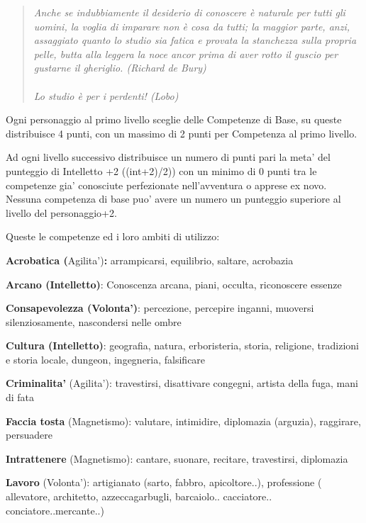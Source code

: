 \documentclass[a4paper,11pt,twoside,openany]{book}
\begin{document}
\begin{quote}\textit{
Anche se indubbiamente il desiderio di conoscere è naturale per tutti gli uomini, la voglia di imparare non è cosa da tutti; la maggior parte, anzi, assaggiato quanto lo studio sia fatica e provata la stanchezza sulla propria pelle, butta alla leggera la noce ancor prima di aver rotto il guscio per gustarne il gheriglio. (Richard de Bury)\\\\
Lo studio è per i perdenti! (Lobo)
}\end{quote}

Ogni personaggio al primo livello sceglie delle Competenze di Base, su queste distribuisce 4 punti, con un massimo di 2 punti per Competenza al primo livello.

Ad ogni livello successivo distribuisce un numero di punti pari la meta' del punteggio di Intelletto +2 ((int+2)/2)) con un minimo di 0 punti tra le competenze gia' conosciute perfezionate nell'avventura o apprese ex novo. Nessuna competenza di base puo' avere un numero un punteggio superiore al livello del personaggio+2.

\bigskip

Queste le competenze ed i loro ambiti di utilizzo:

\textbf{Acrobatica (}Agilita')\textbf{:} arrampicarsi, equilibrio, saltare, acrobazia

\textbf{Arcano (Intelletto)}: Conoscenza arcana, piani, occulta, riconoscere essenze

\textbf{Consapevolezza (Volonta')}: percezione, percepire inganni, muoversi silenziosamente, nascondersi nelle ombre

\textbf{Cultura (Intelletto)}: geografia, natura, erboristeria, storia, religione, tradizioni e storia locale, dungeon, ingegneria, falsificare

\textbf{Criminalita'} (Agilita'): travestirsi, disattivare congegni, artista della fuga, mani di fata

\textbf{Faccia tosta} (Magnetismo): valutare, intimidire, diplomazia (arguzia), raggirare, persuadere

\textbf{Intrattenere} (Magnetismo): cantare, suonare, recitare, travestirsi, diplomazia

\textbf{Lavoro} (Volonta'): artigianato (sarto, fabbro, apicoltore..), professione ( allevatore, architetto, azzeccagarbugli, barcaiolo..
cacciatore.. conciatore..mercante..)
\end{document}
